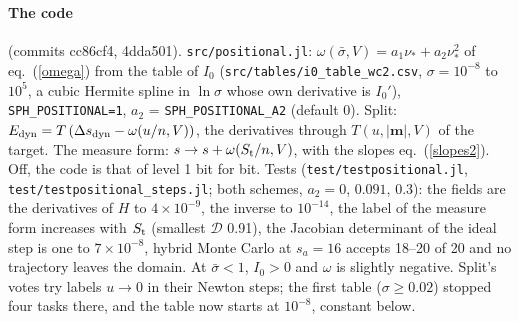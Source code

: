 \documentclass[11pt,aps,preprint,nofootinbib,superscriptaddress,tightenlines]{revtex4-2}
\def\Eq#1{eq.~(\ref{#1})}
\let\oldparagraph\paragraph
\renewcommand{\paragraph}{\par\bigskip\oldparagraph}
\begin{document}
\paragraph{The code} (commits cc86cf4, 4dda501).  \nolinkurl{src/positional.jl}: $\omega(\bar\sigma,V)=a_1\nu_*+a_2\nu_*^2$ of \Eq{omega} from the table
of $I_0$ (\nolinkurl{src/tables/i0_table_wc2.csv}, $\sigma=10^{-8}$ to $10^5$, a cubic Hermite spline in $\ln\sigma$ whose own derivative is $I_0'$),
\texttt{SPH\_POSITIONAL=1}, $a_2$ = \texttt{SPH\_POSITIONAL\_A2} (default 0).  Split: $E_{\rm dyn}=T\,(\Delta s_{\rm dyn}-\omega(u/n,V))$, the derivatives
through $T(u,|\bm m|,V)$ of the target.  The measure form: $s\to s+\omega(S_{\rm t}/n,V)$, with the slopes \Eq{slopes2}.  Off, the code is that of
level 1 bit for bit.  Tests (\nolinkurl{test/testpositional.jl}, \nolinkurl{test/testpositional_steps.jl}; both schemes, $a_2=0$, $0.091$, $0.3$): the
fields are the derivatives of $H$ to $4\times10^{-9}$, the inverse to $10^{-14}$, the label of the measure form increases with $S_{\rm t}$ (smallest
$\mathcal D$ 0.91), the Jacobian determinant of the ideal step is one to $7\times10^{-8}$, hybrid Monte Carlo at $s_a=16$ accepts 18--20 of 20 and no
trajectory leaves the domain.  At $\bar\sigma<1$, $I_0>0$ and $\omega$ is slightly negative.  Split's votes try labels $u\to0$ in their Newton
steps; the first table ($\sigma\ge0.02$) stopped four tasks there, and the table now starts at $10^{-8}$, constant below.
\end{document}
